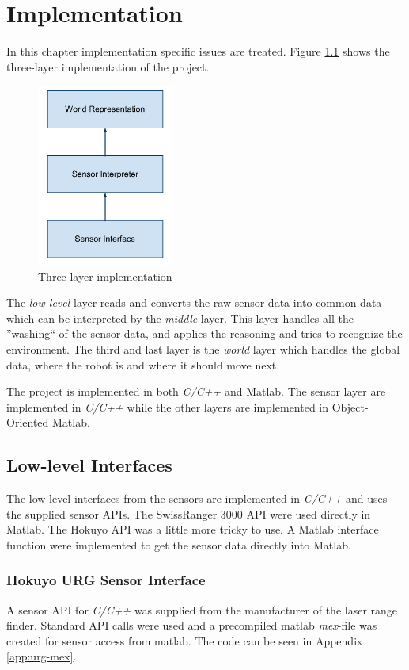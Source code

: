 
\chapter{Implementation}
In this chapter implementation specific issues are treated. Figure
\ref{chap6:fig-implementation} shows the three-layer implementation of the project.
\begin{figure}[htbp]
    \centering
    \includegraphics[width=0.4\textwidth]{pics/implementation}
    \caption{Three-layer implementation}
    \label{chap6:fig-implementation}
\end{figure}
The \emph{low-level} layer reads and converts the raw sensor data into common data which can be
interpreted by the \emph{middle} layer. This layer handles all the ''washing`` of the
sensor data, and applies the reasoning and tries to recognize the environment. The third
and last layer is the \emph{world} layer which handles the global data, where the robot is
and where it should move next. 

The project is implemented in both \emph{C/C++} and Matlab. The sensor layer are
implemented in \emph{C/C++} while the other layers are implemented in Object-Oriented
Matlab.

\section{Low-level Interfaces}
The low-level interfaces from the sensors are implemented in \emph{C/C++} and uses the
supplied sensor APIs. The SwissRanger 3000 API were used directly in Matlab. The Hokuyo
API was a little more tricky to use. A Matlab interface function were implemented to get
the sensor data directly into Matlab.

\subsection{Hokuyo URG Sensor Interface}
A sensor API for \emph{C/C++} was supplied from the manufacturer of the laser range
finder. Standard API calls were used and a precompiled matlab \emph{mex}-file was created
for sensor access from matlab. The code can be seen in Appendix \ref{app:urg-mex}.


